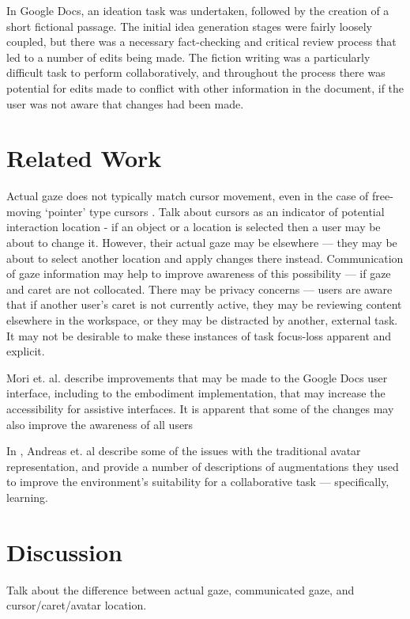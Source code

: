 \documentclass{acm_proc_article-sp}
\begin{document}
In Google Docs, an ideation task was undertaken, followed by the creation of a short fictional passage. The initial idea generation stages were fairly loosely coupled, but there was a necessary fact-checking and critical review process that led to a number of edits being made. The fiction writing was a particularly difficult task to perform collaboratively, and throughout the process there was potential for edits made to conflict with other information in the document, if the user was not aware that changes had been made.


\section{Related Work}

Actual gaze does not typically match cursor movement, even in the case of free-moving `pointer' type cursors \cite{byrne1999eye}. Talk about cursors as an indicator of potential interaction location - if an object or a location is selected then a user may be about to change it. However, their actual gaze may be elsewhere --- they may be about to select another location and apply changes there instead. Communication of gaze information may help to improve awareness of this possibility --- if gaze and caret are not collocated. There may be privacy concerns --- users are aware that if another user's caret is not currently active, they may be reviewing content elsewhere in the workspace, or they may be distracted by another, external task. It may not be desirable to make these instances of task focus-loss apparent and explicit.

Mori et. al. \cite{mori2011collaborative} describe improvements that may be made to the Google Docs user interface, including to the embodiment implementation, that may increase the accessibility for assistive interfaces. It is apparent that some of the changes may also improve the awareness of all users

In \cite{andreas2010fostering}, Andreas et. al describe some of the issues with the traditional avatar representation, and provide a number of descriptions of augmentations they used to improve the environment's suitability for a collaborative task --- specifically, learning.


\section{Discussion}
Talk about the difference between actual gaze, communicated gaze, and cursor/caret/avatar location.
\end{document}
